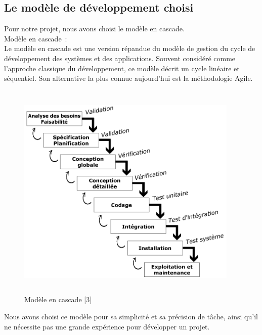 \documentclass[11.5pt]{report}
\begin{document}
\subsection{Le modèle de développement choisi }
Pour notre projet, nous avons choisi le modèle en cascade.\\
Modèle en cascade :\\
Le modèle en cascade est une version répandue du modèle de gestion du cycle de développement des systèmes et des applications. Souvent considéré comme l'approche classique du développement, ce modèle décrit un cycle linéaire et séquentiel. Son alternative la plus connue aujourd’hui est la méthodologie Agile.
\begin{figure}[h]
	
	\begin{center}
		\includegraphics[width=300pt,height=300pt]{cascade.png} 
		\caption{Modèle en cascade [3]}
	\end{center}
	
\end{figure}
\clearpage
Nous avons choisi ce modèle pour sa simplicité et sa précision de tâche, ainsi qu’il ne nécessite pas une grande expérience pour développer un projet.
\end{document}
